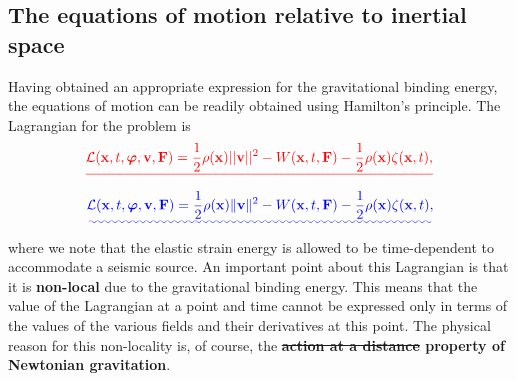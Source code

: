 \documentclass[a4paper,12pt]{paper}
\providecommand{\DIFadd}[1]{{\protect\color{blue}\uwave{#1}}} %
\providecommand{\DIFdel}[1]{{\protect\color{red}\sout{#1}}}                      %
\providecommand{\DIFaddbegin}{} %
\providecommand{\DIFaddend}{} %
\providecommand{\DIFdelbegin}{} %
\providecommand{\DIFdelend}{} %
\begin{document}
\subsection*{The equations of motion relative to inertial space}

Having obtained an appropriate expression for the gravitational binding energy, the equations of motion can 
be readily obtained using Hamilton's principle. The Lagrangian for the problem is
\DIFdelbegin \begin{displaymath}
\DIFdel{\mathcal{L}(\mathbf{x},t,\bphi,\mathbf{v},\mathbf{F})=\frac{1}{2}\rho(\mathbf{x})||\mathbf{v}||^{2}
-W(\mathbf{x},t,\mathbf{F})-\frac{1}{2}\rho(\mathbf{x})\zeta(\mathbf{x},t) ,
}\end{displaymath}%
\DIFdelend \DIFaddbegin \begin{equation}
\DIFadd{\mathcal{L}(\mathbf{x},t,\bphi,\mathbf{v},\mathbf{F})=\frac{1}{2}\rho(\mathbf{x})\|\mathbf{v}\|^{2}
-W(\mathbf{x},t,\mathbf{F})-\frac{1}{2}\rho(\mathbf{x})\zeta(\mathbf{x},t),
\label{eq:20}
}\end{equation}\DIFaddend 
where we note that the elastic strain energy is allowed to be time-dependent to accommodate a seismic source. 
An important point about this Lagrangian is that it is \textbf{non-local} due to the gravitational binding energy. This 
means that the value of the Lagrangian at a point and time cannot be expressed only in terms of the values of 
the various fields and their derivatives at this point. The physical reason for this non-locality is, of course, 
the \textbf{\DIFdelbegin \DIFdel{action at a distance }\DIFdelend \DIFaddbegin \DIFadd{action-at-a-distance }\DIFaddend property of Newtonian gravitation}. 
\end{document}
